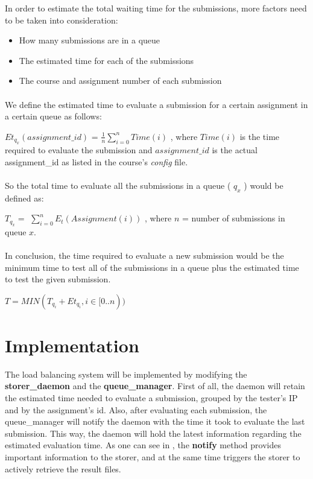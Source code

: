 In order to estimate the total waiting time for the submissions, more factors
need to be taken into consideration:
\begin{itemize}
\item How many submissions are in a queue
\item The estimated time for each of the submissions
\item The course and assignment number of each submission 
\end{itemize}

\paragraph{}

We define the estimated time to evaluate a submission for a certain assignment in 
a certain queue as follows:

$ Et_{q_x}( assignment\_id) $ = $\frac{1}{n} \displaystyle\sum\limits_{i=0}^{n} Time(i)$ , where
$ Time(i) $ is the time required to evaluate the submission and $assignment\_id$ is the actual 
assignment_id as listed in the course's {\it config} file.

\paragraph{}

So the total time to evaluate all the submissions in a queue ( $ q_x $ ) would be defined as:

$ T_{ q_x} = $ $\displaystyle\sum\limits_{i=0}^{n} E_t(Assignment(i))$ , where $ n $ = number of submissions in  queue $  x $.

\paragraph{}

In conclusion, the time required to evaluate a new submission would be the minimum time
to test all of the submissions in a queue plus the estimated time to test the given
submission.

$ T = MIN( T_{q_i} + Et_{q_i}, i \in [0..n) ) $


\section{Implementation}
\label{sec:vmc-load-impl}

The load balancing system will be implemented by modifying the {\bf storer_daemon}
and the {\bf queue_manager}. First of all, the daemon will retain the estimated
time needed to evaluate a submission, grouped by the tester's IP and by
the assignment's id. Also, after evaluating each submission, the queue_manager
will notify the daemon with the time it took to evaluate the last submission.
This way, the daemon will hold the latest information regarding the estimated
evaluation time. As one can see in ,
the {\bf notify} method provides important information to the storer, and at the same
time triggers the storer to actively retrieve the result files.

